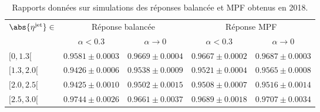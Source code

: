 \begin{table}[h]
\centering
\begin{tabular}{lcccc}
\toprule
\multirow{2}{*}{$\abs{\eta^\text{jet}}\in$} & \multicolumn{2}{c}{Réponse balancée} & \multicolumn{2}{c}{Réponse MPF} \\
\cmidrule(lr){2-3}\cmidrule(lr){4-5}
 & $\alpha<\num{0.3}$ & $\alpha\to0$ & $\alpha<\num{0.3}$ & $\alpha\to0$\\
\midrule
$[\num{0}, \num{1.3}[$ & $\num{0.9581}\pm\num{0.0003}$ & $\num{0.9669}\pm\num{0.0004}$ & $\num{0.9667}\pm\num{0.0002}$ & $\num{0.9687}\pm\num{0.0003}$ \\
$[\num{1.3}, \num{2.0}[$ & $\num{0.9426}\pm\num{0.0006}$ & $\num{0.9538}\pm\num{0.0009}$ & $\num{0.9521}\pm\num{0.0004}$ & $\num{0.9565}\pm\num{0.0008}$ \\
$[\num{2.0}, \num{2.5}[$ & $\num{0.9425}\pm\num{0.0010}$ & $\num{0.9502}\pm\num{0.0015}$ & $\num{0.9508}\pm\num{0.0007}$ & $\num{0.9516}\pm\num{0.0014}$ \\
$[\num{2.5}, \num{3.0}[$ & $\num{0.9744}\pm\num{0.0026}$ & $\num{0.9661}\pm\num{0.0037}$ & $\num{0.9689}\pm\num{0.0018}$ & $\num{0.9707}\pm\num{0.0034}$ \\
\bottomrule
\end{tabular}
\caption[Rapports des réponses balancée et MPF obtenus en 2018.]{Rapports données sur simulations des réponses balancée et MPF obtenus en 2018.}
\label{tab-responses_recap_table_2018ABCD}
\end{table}